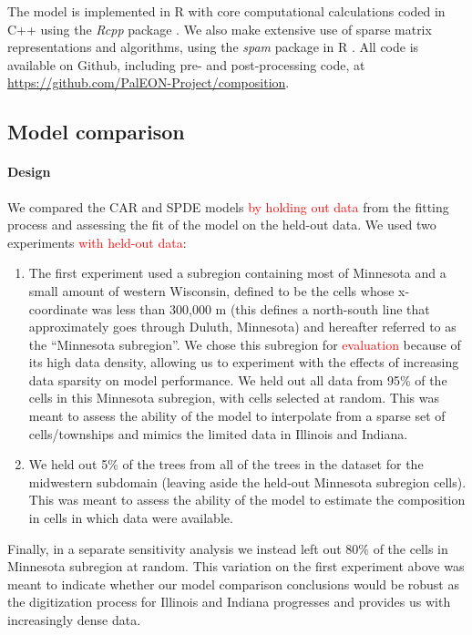 \documentclass[10pt,letterpaper]{article}
\begin{document}
The model is implemented in R \cite{R:2014} with core computational
calculations coded in C++ using the \emph{Rcpp} package \cite{Edde:Fran:2011}.
We also make extensive use of sparse matrix representations and algorithms,
using the \emph{spam} package in R \cite{Furr:Sain:2010}. All code
is available on Github, including pre- and post-processing code, at
\href{https://github.com/PalEON-Project/composition}{https://github.com/PalEON-Project/composition}. 



\subsection*{Model comparison\label{sec:Model-comparison}}


\paragraph*{Design}

We compared the CAR and SPDE models \textcolor{red}{by holding out
data} from the fitting process and assessing the fit of the model
on the held-out data. We used two experiments\textcolor{red}{{} with
held-out data}:
\begin{enumerate}
\item The first experiment used a subregion containing most of Minnesota
and a small amount of western Wisconsin, defined to be the cells whose
x-coordinate was less than 300,000 m (this defines a north-south line
that approximately goes through Duluth, Minnesota) and hereafter referred
to as the ``Minnesota subregion''. We chose this subregion for \textcolor{red}{evaluation}
because of its high data density, allowing us to experiment with the
effects of increasing data sparsity on model performance. We held
out all data from 95\% of the cells in this Minnesota subregion, with
cells selected at random. This was meant to assess the ability of
the model to interpolate from a sparse set of cells/townships and
mimics the limited data in Illinois and Indiana.
\item We held out 5\% of the trees from all of the trees in the dataset
for the midwestern subdomain (leaving aside the held-out Minnesota
subregion cells). This was meant to assess the ability of the model
to estimate the composition in cells in which data were available. 
\end{enumerate}
Finally, in a separate sensitivity analysis we instead left out 80\%
of the cells in Minnesota subregion at random. This variation on the
first experiment above was meant to indicate whether our model comparison
conclusions would be robust as the digitization process for Illinois
and Indiana progresses and provides us with increasingly dense data. 
\end{document}
